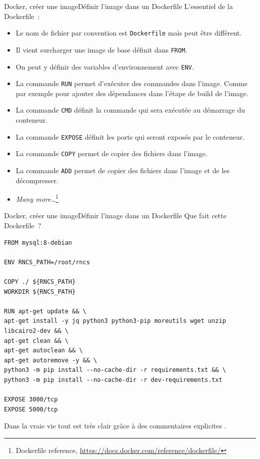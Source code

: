 \documentclass{beamer}
\begin{document}
    \begin{frame}{Docker, créer une image}{Définir l'image dans un Dockerfile}
        L'essentiel de la Dockerfile~:
        \begin{itemize}
            \item Le nom de fichier par convention est \lstinline{Dockerfile} mais peut être différent.
            \item Il vient surcharger une image de base définit dans \lstinline{FROM}.
            \item On peut y définir des variables d'environnement avec \lstinline{ENV}.
            \item La commande \lstinline{RUN} permet d'exécuter des commandes dans l'image.
            Comme par exemple pour ajouter des dépendances dans l'étape de build de l'image.
            \item La commande \lstinline{CMD} définit la commande qui sera exécutée au démarrage du conteneur.
            \item La commande \lstinline{EXPOSE} définit les ports qui seront exposés par le conteneur.
            \item La commande \lstinline{COPY} permet de copier des fichiers dans l'image.
            \item La commande \lstinline{ADD} permet de copier des fichiers dans l'image et de les décompresser.
            \item \textit{Many more\ldots}\footnote{Dockerfile reference, \url{https://docs.docker.com/reference/dockerfile/}}
        \end{itemize}
    \end{frame}

    \begin{frame}[fragile]{Docker, créer une image}{Définir l'image dans un Dockerfile}
        Que fait cette Dockerfile~?
        \begin{lstlisting}[basicstyle=\ttfamily\tiny]
FROM mysql:8-debian

ENV RNCS_PATH=/root/rncs

COPY ./ ${RNCS_PATH}
WORKDIR ${RNCS_PATH}

RUN apt-get update && \
apt-get install -y jq python3 python3-pip moreutils wget unzip libcairo2-dev && \
apt-get clean && \
apt-get autoclean && \
apt-get autoremove -y && \
python3 -m pip install --no-cache-dir -r requirements.txt && \
python3 -m pip install --no-cache-dir -r dev-requirements.txt

EXPOSE 3000/tcp
EXPOSE 5000/tcp
        \end{lstlisting}
        Dans la vraie vie tout est très clair grâce à des commentaires explicites .
    \end{frame}
\end{document}
